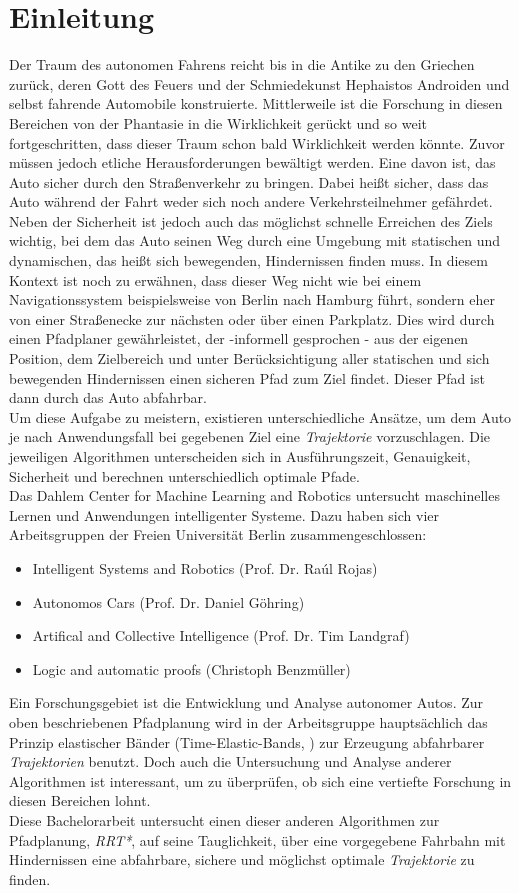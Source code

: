 \section{Einleitung}
Der Traum des autonomen Fahrens reicht bis in die Antike zu den Griechen zurück, deren Gott des Feuers und der Schmiedekunst Hephaistos Androiden und selbst fahrende Automobile konstruierte. Mittlerweile ist die Forschung in diesen Bereichen von der Phantasie in die Wirklichkeit gerückt und so weit fortgeschritten, dass dieser Traum schon bald Wirklichkeit werden könnte. Zuvor müssen jedoch etliche Herausforderungen bewältigt werden. Eine davon ist, das Auto sicher durch den Straßenverkehr zu bringen. Dabei heißt sicher, dass das Auto während der Fahrt weder sich noch andere Verkehrsteilnehmer gefährdet. Neben der Sicherheit ist jedoch auch das möglichst schnelle Erreichen des Ziels wichtig, bei dem das Auto seinen Weg durch eine Umgebung mit statischen und dynamischen, das heißt sich bewegenden, Hindernissen finden muss. In diesem Kontext ist noch zu erwähnen, dass dieser Weg nicht wie bei einem Navigationssystem beispielsweise von Berlin nach Hamburg führt, sondern eher von einer Straßenecke zur nächsten oder über einen Parkplatz. Dies wird durch einen Pfadplaner gewährleistet, der -informell gesprochen - aus der eigenen Position, dem Zielbereich und unter Berücksichtigung aller statischen und sich bewegenden Hindernissen einen sicheren Pfad zum Ziel findet. Dieser Pfad ist dann durch das Auto abfahrbar.\\
Um diese Aufgabe zu meistern, existieren unterschiedliche Ansätze, um dem Auto je nach Anwendungsfall bei gegebenen Ziel eine \textit{Trajektorie} vorzuschlagen. Die jeweiligen Algorithmen unterscheiden sich in Ausführungszeit, Genauigkeit, Sicherheit und berechnen unterschiedlich optimale Pfade.  \\
Das Dahlem Center for Machine Learning and Robotics untersucht maschinelles Lernen und Anwendungen intelligenter Systeme. Dazu haben sich vier Arbeitsgruppen der Freien Universität Berlin zusammengeschlossen:
\begin{itemize}
\item Intelligent Systems and Robotics (Prof. Dr. Raúl Rojas)
\item Autonomos Cars (Prof. Dr. Daniel Göhring)
\item Artifical and Collective Intelligence (Prof. Dr. Tim Landgraf)
\item Logic and automatic proofs (Christoph Benzmüller)
\end{itemize}
Ein Forschungsgebiet ist die Entwicklung und Analyse autonomer Autos. Zur oben beschriebenen Pfadplanung wird in der Arbeitsgruppe hauptsächlich das Prinzip elastischer Bänder (Time-Elastic-Bands, \citep[vgl.][]{RoeHoBe}) zur Erzeugung abfahrbarer \textit{Trajektorien} benutzt. Doch auch die Untersuchung und Analyse anderer Algorithmen ist interessant, um zu überprüfen, ob sich eine vertiefte Forschung in diesen Bereichen lohnt. \\ 
Diese Bachelorarbeit untersucht einen dieser anderen Algorithmen zur Pfadplanung, \textit{RRT*}, auf seine Tauglichkeit, über eine vorgegebene Fahrbahn mit Hindernissen eine abfahrbare, sichere und möglichst optimale \textit{Trajektorie} zu finden. 

